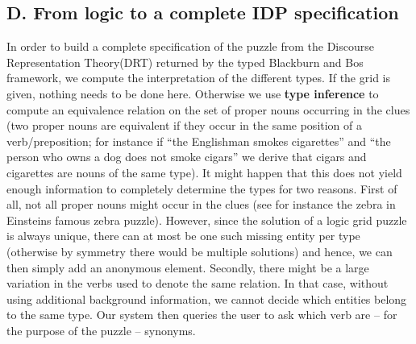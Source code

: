 \subsection{D. From logic to a complete IDP specification} 
In order to build a complete specification of the puzzle from the Discourse Representation Theory(DRT) returned by the typed Blackburn and Bos framework, we compute the interpretation of the different types. If the grid is given, nothing needs to be done here. Otherwise we use \textbf{type inference} to compute an equivalence relation on the set of proper nouns occurring in the clues (two proper nouns are equivalent if they occur in the same position of a verb/preposition; for instance if ``the Englishman smokes cigarettes'' and ``the person who owns a dog does not smoke cigars'' we derive that cigars and cigarettes are nouns of the same type). It might happen that this does not yield enough information to completely determine the types for two reasons. 
First of all, not all proper nouns might occur in the clues (see for instance the zebra in Einsteins famous zebra puzzle). 
However, since the solution of a logic grid puzzle is always unique, there can at most be one such missing entity per type (otherwise by symmetry there would be multiple solutions) and hence, we can then simply add an anonymous element. 
Secondly, there might be a large variation in the verbs used to denote the same relation. In that case, without using additional background information, we cannot decide which entities belong to the same type. Our system then queries the user to ask which verb are -- for the purpose of the puzzle -- synonyms. 

